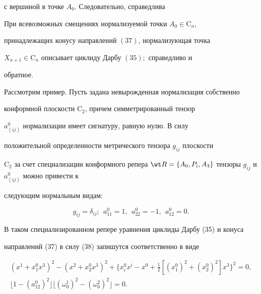 с вершиной в точке $A_0$. Следовательно, справедлива 


 


\begin{thm} 


При всевозможных смещениях нормализуемой точки $A_0\in\mathrm C_n$, 


принадлежащих конусу направлений $(37)$, нормализующая точка 


$X_{n+1}\in\mathrm C_n$ описывает циклиду Дарбу $(35);$ справедливо и 


обратное. 


\end{thm} 


 


Рассмотрим пример. Пусть задана невырожденная нормализация собственно 


конформной плоскости $\mathrm C_2$, причем симметрированный тензор 


$a^0_{(i j)}$ нормализации имеет сигнатуру, равную нулю. В силу 


положительной определенности метрического тензора $g_{i j}$ плоскости 


$\mathrm C_2$ за счет специализации конформного репера $\wt 


R=\{A_0,P_i,A_3\}$ тензоры $g_{i j}$ и $a^0_{(i j)}$ можно привести к 


следующим нормальным видам: 


\begin{equation} 


g_{i j}=\delta_{i j};\ \ a^0_{11}=1,\ \ a^0_{22}=-1, 


\ \ a^0_{12}=0. 


\end{equation} 


В таком специализированном репере уравнения циклиды Дарбу (35) и конуса 


направлений (37) в силу (38) запишутся соответственно в виде 


\begin{gather} 


(x^1+x^0_1x^3)^2-(x^2+x^0_2x^3)^2+\{x^0_i x^i-x^0+ 


\tfrac{1}{2}[(x^0_1)^2+(x^0_2)^2]x^3\}^2=0, \\ 


\lfloor 1-(a^0_{12})^2\rfloor\lfloor(\omega^1_0)^2- 


(\omega^2_0)^2\rfloor=0. 


\end{gather} 


